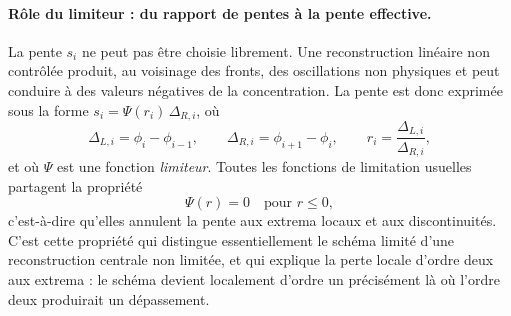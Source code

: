 \documentclass[11pt,a4paper]{report}
\begin{document}
\paragraph{Rôle du limiteur : du rapport de pentes à la pente effective.} La pente \(s_i\) ne peut pas être
choisie librement. Une reconstruction linéaire non contrôlée produit, au voisinage des fronts, des
oscillations non physiques et peut conduire à des valeurs négatives de la concentration. La pente est donc
exprimée sous la forme \(s_i = \Psi(r_i)\,\Delta_{R,i}\), où
\begin{equation}
\Delta_{L,i} = \phi_i - \phi_{i-1},
\qquad
\Delta_{R,i} = \phi_{i+1} - \phi_i,
\qquad
r_i = \frac{\Delta_{L,i}}{\Delta_{R,i}},
\label{eq:rapport-pentes}
\end{equation}
et où \(\Psi\) est une fonction \emph{limiteur}. Toutes les fonctions de limitation usuelles partagent la
propriété
\begin{equation}
\Psi(r) = 0 \quad \text{pour } r \le 0,
\label{eq:psi-nul}
\end{equation}
c'est-à-dire qu'elles annulent la pente aux extrema locaux et aux discontinuités. C'est cette propriété
qui distingue essentiellement le schéma limité d'une reconstruction centrale non limitée, et qui explique
la perte locale d'ordre deux aux extrema : le schéma devient localement d'ordre un précisément là où
l'ordre deux produirait un dépassement.
\end{document}
